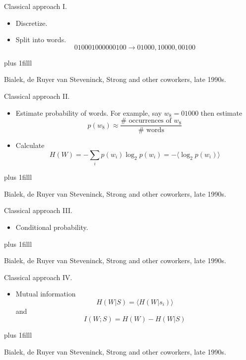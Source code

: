 \documentclass{beamer}
\newcommand{\btVFill}{\vskip0pt plus 1filll}
\begin{document}
\begin{frame}{Classical approach I.}
\begin{itemize}
\item Discretize.
\color{reddish}
\begin{center}

\end{center}
\color{black}
\item Split into words.
\color{dark}
$$010001000000100\rightarrow 01000,10000,00100$$
\color{black}
\end{itemize}
\btVFill
\begin{flushright}
\tiny{Bialek, de Ruyer van Steveninck, Strong and other coworkers, late 1990s.}
\end{flushright}
\end{frame}

\begin{frame}{Classical approach II.}
\begin{itemize}
\item Estimate probability of words. For example, say $w_8=01000$ then estimate
\color{dark}
$$p(w_8)\approx\frac{\#\mbox{ occurrences of }w_8}{\#\mbox{ words}}$$ 
\color{black}
\item Calculate
\color{dark}
$$H(W)=-\sum_i p(w_i)\log_2 p(w_i) =-\langle\log_2 p(w_i)\rangle$$ 
\color{black}
\end{itemize}
\btVFill
\begin{flushright}
\tiny{Bialek, de Ruyer van Steveninck, Strong and other coworkers, late 1990s.}
\end{flushright}
\end{frame}


\begin{frame}{Classical approach III.}
\begin{itemize}
\item Conditional probability.
\color{reddish}
\begin{center}

\end{center}
\color{black}
\end{itemize}
\btVFill
\begin{flushright}
\tiny{Bialek, de Ruyer van Steveninck, Strong and other coworkers, late 1990s.}
\end{flushright}
\end{frame}


\begin{frame}{Classical approach IV.}
\begin{itemize}
\item Mutual information
\color{dark}
$$H(W|S)=\langle H(W|s_i)\rangle$$
\color{black}
and
\color{dark}
$$I(W;S)=H(W)-H(W|S)$$
\color{black}
\end{itemize}
\btVFill
\begin{flushright}
\tiny{Bialek, de Ruyer van Steveninck, Strong and other coworkers, late 1990s.}
\end{flushright}
\end{frame}
\end{document}

